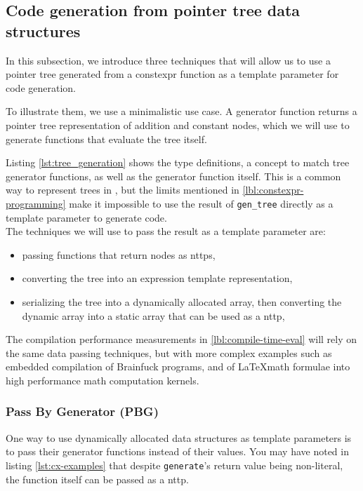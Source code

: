 \documentclass[../main]{subfiles}
\begin{document}
\subsection{
  Code generation from pointer tree data structures
}

\label{lbl:ptr-tree-codegen}

In this subsection, we introduce three techniques that will allow us to use
a pointer tree generated from a \gls{constexpr} function as a template parameter
for code generation.

To illustrate them, we use a minimalistic use case.
A generator function returns a pointer tree representation of addition and
constant nodes, which we will use to generate functions that evaluate
the tree itself.

Listing \ref{lst:tree_generation} shows the type definitions, a concept to
match tree generator functions, as well as the generator function itself.
This is a common way to represent trees in \cpp, but the limits mentioned in
\ref{lbl:constexpr-programming} make it impossible to use the result of
\lstinline{gen_tree} directly as a template parameter to generate code.
\\

The techniques we will use to pass the result as a template parameter are:

\begin{itemize}
\item passing functions that return nodes as \glspl{nttp},
\item converting the tree into an expression template representation,
\item serializing the tree into a dynamically allocated array,
      then converting the dynamic array into a static array that can be used as
      a \gls{nttp},
\end{itemize}

The compilation performance measurements in \ref{lbl:compile-time-eval} will
rely on the same data passing techniques, but with more complex examples such
as embedded compilation of Brainfuck programs, and of \LaTeX math formulae
into high performance math computation kernels.

\subsubsection{
  Pass By Generator (PBG)
}

\label{lbl:pbg-technique}

One way to use dynamically allocated data structures as template parameters
is to pass their generator functions instead of their values.
You may have noted in listing \ref{lst:cx-examples} that despite
\lstinline{generate}'s return value being non-literal, the function itself
can be passed as a \gls{nttp}.
\end{document}
